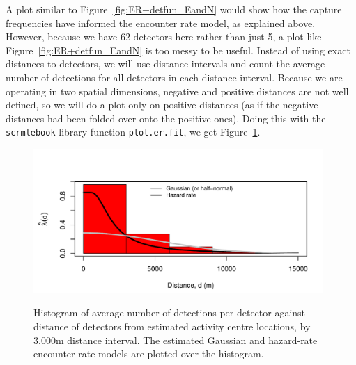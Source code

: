 A plot similar to Figure~\ref{fig:ER+detfun_EandN} would show how the capture frequencies have informed the encounter rate model, as explained above. However, because we have 62 detectors here rather than just 5, a plot like Figure~\ref{fig:ER+detfun_EandN} is too messy to be useful. Instead of using exact distances to detectors, we will use distance intervals and count the average number of detections for all detectors in each distance interval. Because we are operating in two spatial dimensions, negative and positive distances are not well defined, so we will do a plot only on positive distances (as if the negative distances had been folded over onto the positive ones). Doing this with the \texttt{scrmlebook} library function \texttt{plot.er.fit}, we get Figure~\ref{fig:ERdetfun.hrfit}. 

{\small
\begin{knitrout}
\color{fgcolor}\begin{kframe}
\begin{alltt}
\hlstd{=}\hlstd{,}\hlstd{=}\hlstd{,}\hlstd{=}\hlstd{,}
            \hlstd{=}\hlstd{,}\hlstd{=}\hlstd{(}
\hlstd{=}\hlstd{(}\hlstd{,}\hlstd{,}\hlstd{=}\hlstd{),}\hlstd{=}\hlstd{,}\hlstd{=}\hlstd{,}\hlstd{=}\hlstd{)}
\hlstd{(}\hlstd{,}\hlstd{=}\hlstd{(}\hlstd{,}\hlstd{),}
       \hlstd{=}\hlstd{(}\hlstd{,}\hlstd{),}\hlstd{=}\hlstd{,}\hlstd{=}\hlstd{,}\hlstd{=}\hlstd{)}
\end{alltt}
\end{kframe}
\end{knitrout}
} 


\begin{figure}[ht]
\caption{\small Histogram of average number of detections per detector against distance of detectors from estimated activity centre locations, by 3,000m distance interval. The estimated Gaussian and hazard-rate encounter rate models are plotted over the histogram.}
\centering
\vspace{-24pt}
\includegraphics[width=11cm]{keepfigure/ERdetfun-hrfit.pdf}
\label{fig:ERdetfun.hrfit}
\end{figure}

